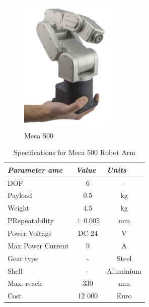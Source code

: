  
\begin{figure}[H]
	\centering
	\includegraphics[width=0.4\textwidth]{Src/images/Meca500.jpg}
	\caption{Meca 500}
    \label{Meca1}
\end{figure}

\begin{table}[H]
    \caption{Specifications for Meca 500 Robot Arm}\label{tab:Meca1}
    \centering
    \begin{tabular}{|l|c|c|}
        \hline
        \textit{\textbf{Parameter ame}} & \multicolumn{1}{l|}{\textit{\textbf{Value}}} & \multicolumn{1}{l|}{\textit{\textbf{Units}}} \\ \hline
        DOF                  & 6     & -     \\ \hline
        Payload              & 0.5 & kg    \\ \hline
        Weight               & 4.5   & kg    \\ \hline
        PRepeatability & ± 0.005 & mm    \\ \hline
        Power Voltage        & DC 24 & V     \\ \hline
        Max Power Current        & 9    & A     \\ \hline
        Gear type            & -     & Steel \\ \hline
        Shell                & -     & Aluminium \\ \hline
        Max. reach           & 330     & mm \\ \hline
        Cost                & 12 000     & Euro \\ \hline
        \end{tabular}
 \end{table}